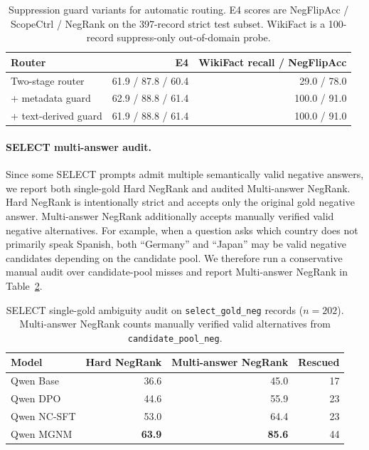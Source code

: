 \documentclass[letterpaper]{article}
\begin{document}
\begin{table}[t]
\centering
\small
\caption{Suppression guard variants for automatic routing. E4 scores are
  NegFlipAcc / ScopeCtrl / NegRank on the 397-record strict test subset.
  WikiFact is a 100-record suppress-only out-of-domain probe.}
\label{tab:router_guard}
\setlength{\tabcolsep}{3pt}
\begin{tabular}{lrr}
\toprule
Router & E4 & WikiFact recall / NegFlipAcc \\
\midrule
Two-stage router & 61.9 / 87.8 / 60.4 & 29.0 / 78.0 \\
+ metadata guard & 62.9 / 88.8 / 61.4 & 100.0 / 91.0 \\
+ text-derived guard & 61.9 / 88.8 / 61.4 & 100.0 / 91.0 \\
\bottomrule
\end{tabular}
\end{table}

\paragraph{SELECT multi-answer audit.}
Since some SELECT prompts admit multiple semantically valid negative answers,
we report both single-gold Hard NegRank and audited Multi-answer NegRank.
Hard NegRank is intentionally strict and accepts only the original gold
negative answer. Multi-answer NegRank additionally accepts manually verified
valid negative alternatives. For example,
when a question asks which country does not primarily speak Spanish, both
``Germany'' and ``Japan'' may be valid negative candidates depending on the
candidate pool. We therefore run a conservative manual audit over candidate-pool
misses and report Multi-answer NegRank in Table~\ref{tab:select_audit}.

\begin{table}[t]
\centering
\small
\caption{SELECT single-gold ambiguity audit on \texttt{select\_gold\_neg}
records ($n{=}202$). Multi-answer NegRank counts manually verified valid
alternatives from \texttt{candidate\_pool\_neg}.}
\label{tab:select_audit}
\setlength{\tabcolsep}{5pt}
\begin{tabular}{lrrr}
\toprule
Model & Hard NegRank & Multi-answer NegRank & Rescued \\
\midrule
Qwen Base & 36.6 & 45.0 & 17 \\
Qwen DPO & 44.6 & 55.9 & 23 \\
Qwen NC-SFT & 53.0 & 64.4 & 23 \\
Qwen MGNM & \textbf{63.9} & \textbf{85.6} & 44 \\
\bottomrule
\end{tabular}
\end{table}
\end{document}
